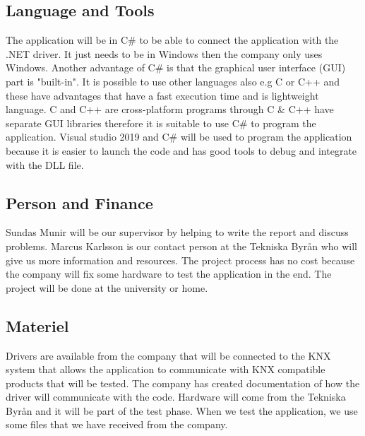 \documentclass{article}
\begin{document}
\subsection{Language and Tools}
The application will be in C\# to be able to connect the application with the .NET driver. It just needs to be in Windows then the company only uses Windows. Another advantage of C\# is that the graphical user interface (GUI) part is "built-in". It is possible to use other languages also e.g C or C++ and these have advantages that have a fast execution time and is lightweight language. C and C++ are cross-platform programs through C \& C++ have separate GUI libraries therefore it is suitable to use C\# to program the application. Visual studio 2019 and C\# will be used to program the application because it is easier to launch the code and has good tools to debug and integrate with the DLL file.\cite{CPROG}
\subsection{Person and Finance}
Sundas Munir will be our supervisor by helping to write the report and discuss problems. Marcus Karlsson is our contact person 
at the Tekniska Byrån who will give us more information and resources. The project process has no cost because the company will fix 
some hardware to test the application in the end. The project will be done at the university or home.
\subsection{Materiel}
Drivers are available from the company that will be connected to the KNX system that allows the application to communicate with KNX compatible products that will be tested. The company has created documentation of how the driver will communicate with the code. Hardware will come from the Tekniska Byrån and it will be part of the test phase. When we test the application, we use some files that we have received from the company. 
\end{document}
